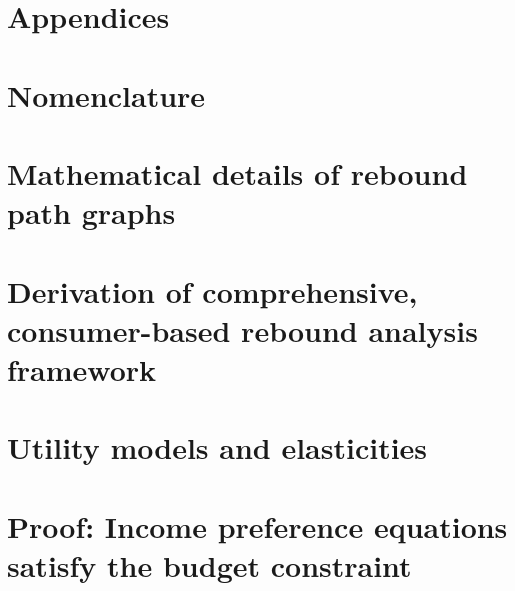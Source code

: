 \documentclass[12pt]{article}\usepackage[]{graphicx}\usepackage[]{xcolor}
\begin{document}
\section*{Appendices}

\renewcommand{\thesection}{\Alph{section}}


\section{Nomenclature}
\label{sec:nomenclature}




\section{Mathematical details of rebound path graphs}
\label{sec:graph_details}





\section{Derivation of comprehensive, consumer-based rebound analysis framework}
\label{sec:derivation}





\section{Utility models and elasticities}
\label{sec:utility_and_elasticities}

% 


\section{Proof: Income preference equations satisfy the budget constraint}
\label{sec:proof_income_elasticities}
\end{document}
